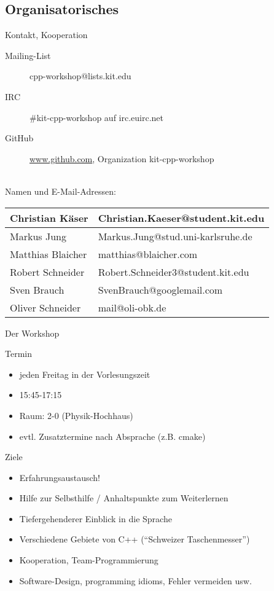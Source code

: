 \subsection{Organisatorisches}

\begin{frame}{Kontakt, Kooperation}
	\begin{description}
		\item[Mailing-List] cpp-workshop@lists.kit.edu
		\item[IRC] \#kit-cpp-workshop auf irc.euirc.net
		\item[GitHub]	\url{www.github.com}, Organization kit-cpp-workshop
	\end{description}
	\ \\
	
	Namen und E-Mail-Adressen:
	\begin{table}
		\begin{tabular}{l|l}
			Christian Käser	&	Christian.Kaeser@student.kit.edu	\\
			\hline
			Markus Jung		&	Markus.Jung@stud.uni-karlsruhe.de	\\
			\hline
			Matthias Blaicher	&	matthias@blaicher.com	\\
			\hline
			Robert Schneider	&	Robert.Schneider3@student.kit.edu	\\
			\hline
			Sven Brauch	&	SvenBrauch@googlemail.com	\\
			\hline
			Oliver Schneider	&	mail@oli-obk.de	\\
		\end{tabular}
	\end{table}
\end{frame}

\begin{frame}{Der Workshop}
	\begin{block}{Termin}
		\begin{itemize}
			\item jeden Freitag in der Vorlesungszeit
			\item 15:45-17:15
			\item Raum: 2-0 (Physik-Hochhaus)
			\item evtl. Zusatztermine nach Absprache (z.B. cmake)
		\end{itemize}
	\end{block}
	\pause
	\begin{block}{Ziele}
		\begin{itemize}
			\item Erfahrungsaustausch!
			\item Hilfe zur Selbsthilfe / Anhaltspunkte zum Weiterlernen
			\item Tiefergehenderer Einblick in die Sprache
			\item Verschiedene Gebiete von C++ (\enquote{Schweizer Taschenmesser})
			\item Kooperation, Team-Programmierung
			\item Software-Design, programming idioms, Fehler vermeiden usw.
		\end{itemize}
	\end{block}
\end{frame}


